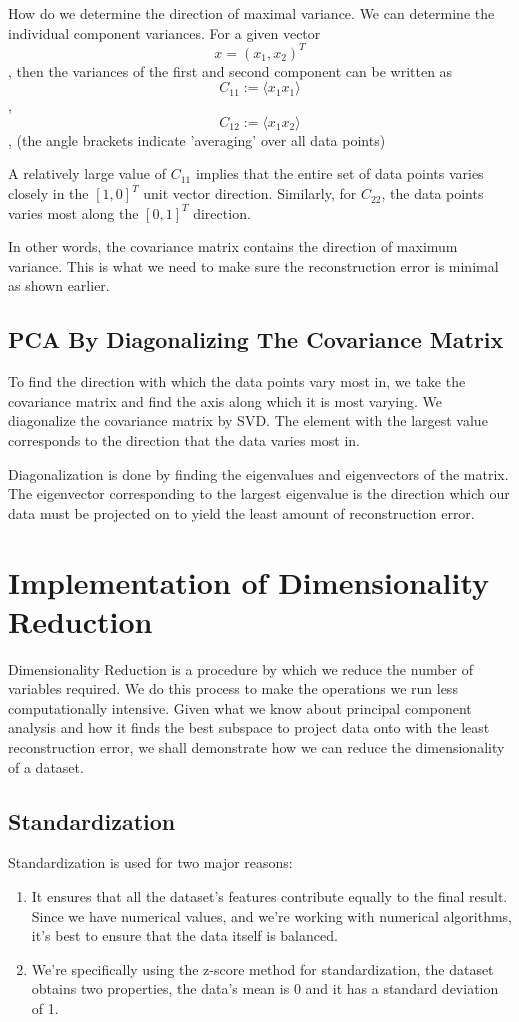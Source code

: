\documentclass[conference]{IEEEtran}
\begin{document}
How do we determine the direction of maximal variance. We can determine the individual component variances. For a given vector $$x=(x_1, x_2)^T$$, then the variances of the first and second component can be written as $$C_{11} := \langle x_1 x_1\rangle$$ ,$$C_{12} := \langle x_1 x_2\rangle$$, (the angle brackets indicate 'averaging' over all data points)

A relatively large value of \(C_{11}\) implies that the entire set of data points varies closely in the \([1,0]^T\) unit vector direction. Similarly, for \(C_{22}\), the data points varies most along the \([0,1]^T\) direction.

In other words, the covariance matrix contains the direction of maximum variance. This is what we need to make sure the reconstruction error is minimal as shown earlier.

\subsection{PCA By Diagonalizing The Covariance Matrix}

To find the direction with which the data points vary most in, we take the covariance matrix and find the axis along which it is most varying. We diagonalize the covariance matrix by SVD. The element with the largest value corresponds to the direction that the data varies most in.

Diagonalization is done by finding the eigenvalues and eigenvectors of the matrix. The eigenvector corresponding to the largest eigenvalue is the direction which our data must be projected on to yield the least amount of reconstruction error.

\section{Implementation of Dimensionality Reduction}

Dimensionality Reduction is a procedure by which we reduce the number of variables required. We do this process to make the operations we run  less computationally intensive. Given what we know about principal component analysis and how it finds the best subspace to project data onto with the least reconstruction error, we shall demonstrate how we can reduce the dimensionality of a dataset.

\subsection{Standardization}
Standardization is used for two major reasons:
\begin{enumerate}
	\item It ensures that all the dataset's features contribute equally to the final result. Since we have numerical values, and we're working with numerical algorithms, it's best to ensure that the data itself is balanced.
	\item We're specifically using the z-score method for standardization, the dataset obtains two properties, the data's mean is 0 and it has a standard deviation of 1.
\end{enumerate}
\end{document}

